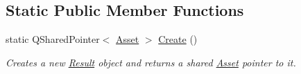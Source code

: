 \subsection*{Static Public Member Functions}
\begin{DoxyCompactItemize}
\item 
\hypertarget{class_picto_1_1_result_aaf3921cfee9ca798787b2c186c1b15dc}{static Q\-Shared\-Pointer$<$ \hyperlink{class_picto_1_1_asset}{Asset} $>$ \hyperlink{class_picto_1_1_result_aaf3921cfee9ca798787b2c186c1b15dc}{Create} ()}\label{class_picto_1_1_result_aaf3921cfee9ca798787b2c186c1b15dc}

\begin{DoxyCompactList}\small\item\em Creates a new \hyperlink{class_picto_1_1_result}{Result} object and returns a shared \hyperlink{class_picto_1_1_asset}{Asset} pointer to it. \end{DoxyCompactList}\end{DoxyCompactItemize}
